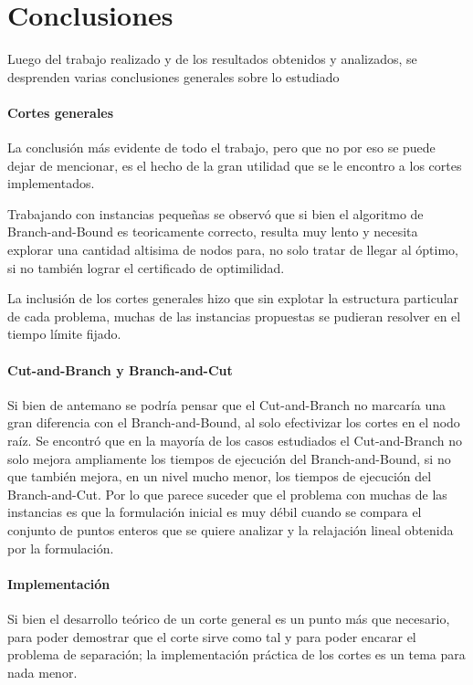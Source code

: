 \section{Conclusiones}


Luego del trabajo realizado y de los resultados obtenidos y analizados, se desprenden varias conclusiones generales sobre lo estudiado

\medskip
\paragraph{Cortes generales}
La conclusi\'on m\'as evidente de todo el trabajo, pero que no por eso se puede dejar de mencionar, es el hecho de la gran utilidad que se le encontro a los cortes implementados.

Trabajando con instancias peque\~nas se observ\'o que si bien el algoritmo de Branch-and-Bound es teoricamente correcto, resulta muy lento y necesita explorar una cantidad altisima de nodos para, no solo tratar de llegar al \'optimo, si no tambi\'en lograr el certificado de optimilidad.

La inclusi\'on de los cortes generales hizo que sin explotar la estructura particular de cada problema, muchas de las instancias propuestas se pudieran resolver en el tiempo l\'imite fijado.

\medskip
\paragraph{Cut-and-Branch y Branch-and-Cut}

Si bien de antemano se podr\'ia pensar que el Cut-and-Branch no marcar\'ia una gran diferencia con el Branch-and-Bound, al solo efectivizar los cortes en el nodo ra\'iz. Se encontr\'o que en la mayor\'ia de los casos estudiados el Cut-and-Branch no solo mejora ampliamente los tiempos de ejecuci\'on del Branch-and-Bound, si no que tambi\'en mejora, en un nivel mucho menor, los tiempos de ejecuci\'on del Branch-and-Cut. Por lo que parece suceder que el problema con muchas de las instancias es que la formulaci\'on inicial es muy d\'ebil cuando se compara el conjunto de puntos enteros que se quiere analizar y la relajaci\'on lineal obtenida por la formulaci\'on.


\medskip
\paragraph{Implementaci\'on}

Si bien el desarrollo te\'orico de un corte general es un punto m\'as que necesario, para poder demostrar que el corte sirve como tal y para poder encarar el problema de separaci\'on; la implementaci\'on pr\'actica de los cortes es un tema para nada menor. 

